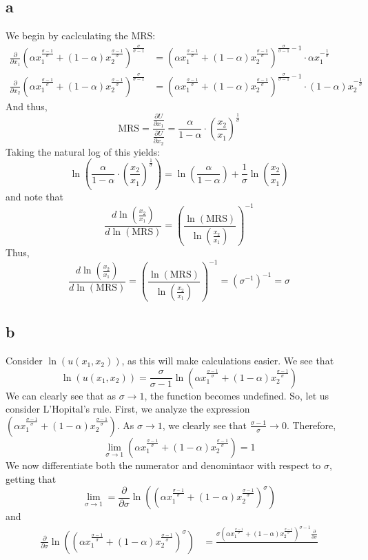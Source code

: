 \documentclass[12pt]{article}
\begin{document}
\subsection*{a}
We begin by caclculating the MRS:
\begin{align*}
    \frac{\partial}{\partial x_1}\left( \alpha x_1^{\frac{\sigma-1}{\sigma}} + (1-\alpha)x_2^{\frac{\sigma -1}{\sigma}} \right)^{\frac{\sigma}{\sigma -1}} &= \left( \alpha x_1^{\frac{\sigma-1}{\sigma}} + (1-\alpha)x_2^{\frac{\sigma -1}{\sigma}} \right)^{\frac{\sigma}{\sigma -1} -1 } \cdot \alpha x_1^{-\frac{1}{\sigma}}\\
    \frac{\partial}{\partial x_2}\left( \alpha x_1^{\frac{\sigma-1}{\sigma}} + (1-\alpha)x_2^{\frac{\sigma -1}{\sigma}} \right)^{\frac{\sigma}{\sigma -1}} &= \left( \alpha x_1^{\frac{\sigma-1}{\sigma}} + (1-\alpha)x_2^{\frac{\sigma -1}{\sigma}} \right)^{\frac{\sigma}{\sigma -1} -1} \cdot (1-\alpha) x_2^{-\frac{1}{\sigma}}
\end{align*}
And thus, 
\[
\text{MRS} = \frac{\frac{\partial U}{\partial x_1}}{\frac{\partial U}{\partial x_2}} = \frac{\alpha}{1-\alpha} \cdot \left( \frac{x_2}{x_1} \right)^{\frac{1}{\sigma}} 
\]
Taking the natural log of this yields:
\[
\ln \left( \frac{\alpha}{1-\alpha} \cdot \left( \frac{x_2}{x_1} \right)^{\frac{1}{\sigma}} \right) = \ln \left( \frac{\alpha}{1-\alpha} \right) + \frac{1}{\sigma} \ln \left( \frac{x_2}{x_1} \right) 
\]
and note that 
\[
\frac{d \ln \left( \frac{x_2}{x_1} \right)}{d \ln(\text{MRS})} = \left( \frac{\ln (\text{MRS})}{\ln \left( \frac{x_2}{x_1} \right)} \right)^{-1}
\]
Thus, 
\[
\frac{d \ln \left( \frac{x_2}{x_1} \right)}{d \ln(\text{MRS})} = \left( \frac{\ln (\text{MRS})}{\ln \left( \frac{x_2}{x_1} \right)} \right)^{-1} = (\sigma^{-1})^{-1} = \sigma
\]
\subsection*{b}
Consider $\ln(u(x_1,x_2))$, as this will make calculations easier. We see that 
\[
\ln(u(x_1, x_2)) = \frac{\sigma}{\sigma - 1} \ln \left( \alpha x_1^{\frac{\sigma -1}{\sigma}} + (1-\alpha)x_2^{\frac{\sigma - 1}{\sigma}} \right)
\] 
We can clearly see that as $\sigma \to 1$, the function becomes undefined. So, let us consider L'Hopital's rule. First, we analyze the expression $\left( \alpha x_1^{\frac{\sigma -1}{\sigma}} + (1-\alpha)x_2^{\frac{\sigma - 1}{\sigma}} \right)$. As $\sigma \to 1$, we clearly see that $\frac{\sigma - 1}{\sigma} \to 0$. Therefore, 
\[
\lim_{\sigma \to 1} \left( \alpha x_1^{\frac{\sigma -1}{\sigma}} + (1-\alpha)x_2^{\frac{\sigma - 1}{\sigma}} \right) = 1
\]
We now differentiate both the numerator and denomintaor with respect to $\sigma$, getting that 
\[
\lim_{\sigma \to 1} = \frac{\partial }{\partial \sigma} \ln\left(\left( \alpha x_1^{\frac{\sigma -1}{\sigma}} + (1-\alpha)x_2^{\frac{\sigma - 1}{\sigma}} \right)^{\sigma}\right)
\]
and 
\begin{align*}
    \frac{\partial }{\partial \sigma} \ln\left(\left( \alpha x_1^{\frac{\sigma -1}{\sigma}} + (1-\alpha)x_2^{\frac{\sigma - 1}{\sigma}} \right)^{\sigma}\right) &= \frac{\sigma \left( \alpha x_1^{\frac{\sigma -1}{\sigma}} + (1-\alpha)x_2^{\frac{\sigma - 1}{\sigma}} \right)^{\sigma - 1} \frac{\partial }{\partial \sigma}}{}
\end{align*}
\end{document}
